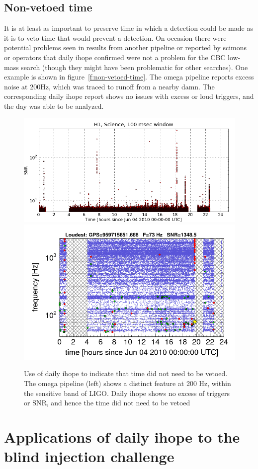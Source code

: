 \subsection{Non-vetoed time}

It is at least as important to preserve time in which a detection
could be made as it is to veto time that would prevent a detection.
On occasion there were potential problems seen in results from
another pipeline or reported by scimons or operators that daily ihope
confirmed were not a problem for the CBC low-mass search (though they
might have been problematic for other searches).  One example is shown
in figure~\ref{f:non-vetoed-time}.  The omega pipeline reports excess
noise at 200Hz, which was traced to runoff from a nearby damn.  The
corresponding daily ihope report shows no issues with excess or loud
triggers, and the day was able to be analyzed.

\begin{figure}
  \includegraphics[width=0.5\linewidth]{figures/detchar/20100604_H1_0_100MILLISEC_CLUSTERED_snr_vs_time}
  \includegraphics[width=0.5\linewidth]{figures/detchar/S6-H1-omega-959644815-959731215-GlitchTS}
  \caption[Use of daily ihope to indicate no veto needed] {
  \label{f:non-vetoed_time}
Use of daily ihope to indicate that time did not need to be vetoed.
The omega pipeline (left) shows a distinct feature at 200 Hz, within
the sensitive band of LIGO.  Daily ihope shows no excess of triggers
or SNR, and hence the time did not need to be vetoed}
\end{figure}%


\section{Applications of daily ihope to the blind injection challenge}


